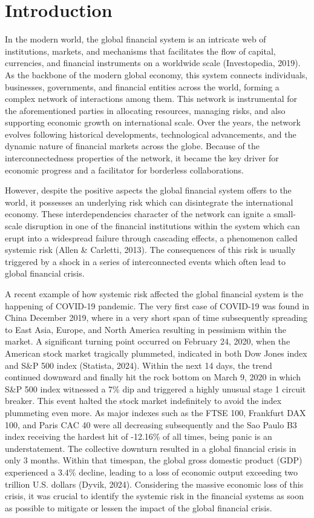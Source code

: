 \documentclass[a4paper,11pt]{article}
\begin{document}
\section{Introduction}
In the modern world, the global financial system is an intricate web of institutions, markets, and mechanisms that facilitates the flow of capital, currencies, and financial instruments on a worldwide scale (Investopedia, 2019). As the backbone of the modern global economy, this system connects individuals, businesses, governments, and financial entities across the world, forming a complex network of interactions among them. This network is instrumental for the aforementioned parties in allocating resources, managing risks, and also supporting economic growth on international scale. Over the years, the network evolves following historical developments, technological advancements, and the dynamic nature of financial markets across the globe. Because of the interconnectedness properties of the network, it became the key driver for economic progress and a facilitator for borderless collaborations.

However, despite the positive aspects the global financial system offers to the world, it possesses an underlying risk which can disintegrate the international economy. These interdependencies character  of the network can ignite a small-scale disruption in one of the financial institutions within the system which can erupt into a widespread failure through cascading effects, a phenomenon  called systemic risk (Allen \& Carletti, 2013). The consequences of this risk is usually triggered by a shock in a series of interconnected events which often lead to global financial crisis.

A recent example of how systemic risk affected the global financial system is the happening of COVID-19 pandemic. The very first case of COVID-19 was found in China December 2019, where in a very short span of time subsequently spreading to East Asia, Europe, and North America resulting in pessimism within the market. A significant turning point occurred on February 24, 2020, when the American stock market tragically plummeted, indicated in both Dow Jones index and S\&P 500 index (Statista, 2024). Within the next 14 days, the trend continued downward and finally hit the rock bottom on March 9, 2020 in which S\&P 500 index witnessed a 7\% dip and triggered a highly unusual stage 1 circuit breaker. This event halted the stock market indefinitely to avoid the index plummeting even more. As major indexes such as the FTSE 100, Frankfurt DAX 100, and Paris CAC 40 were all decreasing subsequently and the Sao Paulo B3 index receiving the hardest hit of -12.16\% of all times, being panic is an understatement. The collective downturn resulted in a global financial crisis in only 3 months. Within that timespan, the global gross domestic product (GDP) experienced a 3.4\% decline, leading to a loss of economic output exceeding two trillion U.S. dollars (Dyvik, 2024). Considering the massive economic loss of this crisis, it was crucial to identify the systemic risk in the financial systems as soon as possible to mitigate or lessen the impact of the global financial crisis.
\end{document}
